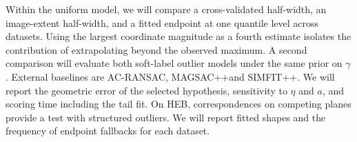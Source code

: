 \documentclass[10pt,twocolumn,letterpaper]{article}
\newcommand{\mname}[1]{\texorpdfstring{#1\xspace}{#1}}
\newcommand{\pp}{\nolinebreak[4]\hspace{-0.05em}+\nolinebreak[4]\hspace{-0.05em}+}
\newcommand{\magsacpp}{\texorpdfstring{MAGSAC\pp\xspace}{MAGSAC++}}
\newcommand{\acransac}{\mname{AC-RANSAC}}
\newcommand{\simfitpp}{\texorpdfstring{SIMFIT\pp\xspace}{SIMFIT++}}
\newcommand{\heb}{\mname{HEB}}
\begin{document}
Within the uniform model, we will compare a cross-validated half-width,
an image-extent half-width, and a fitted endpoint at one quantile level
across datasets. Using the largest coordinate magnitude as a fourth
estimate isolates the contribution of extrapolating beyond the observed
maximum. A second comparison will evaluate both soft-label outlier
models under the same prior on $\gamma$. External baselines are
\acransac, \magsacpp and \simfitpp. We will report the geometric error
of the selected hypothesis, sensitivity to $\eta$ and $a$, and scoring
time including the tail fit. On \heb, correspondences on competing
planes provide a test with structured outliers. We will report fitted
shapes and the frequency of endpoint fallbacks for each dataset.

{
    \small
    
    
}
\end{document}
